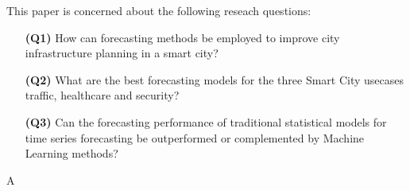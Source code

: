 This paper is concerned about the following reseach questions:

\begin{enumerate}
\item[\textbf{(Q1)}] How can forecasting methods be employed to improve city infrastructure planning in a smart city?
\item[\textbf{(Q2)}] What are the best forecasting models for the three Smart City usecases traffic, healthcare and security?
\item[\textbf{(Q3)}] Can the forecasting performance of traditional statistical models for time series forecasting be outperformed or complemented by Machine Learning methods?
\end{enumerate}

A